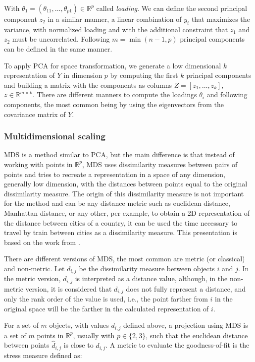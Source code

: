 With $\theta_{1} = (\theta_{11}, \dots, \theta_{p1}) \in \mathbb{R}^p$ called \textit{loading}.
%
We can define the second principal component $z_2$ in a similar manner, a linear combination of $y_i$ that maximizes the variance, with normalized loading and with the additional constraint that $z_1$ and $z_2$ must be uncorrelated. 
%
Following $m = \min{(n -1 , p)}$ principal components can be defined in the same manner.
%

%
To apply PCA for space transformation, we generate a low dimensional $k$ representation of $Y$ in dimension $p$ by computing the first $k$ principal components and building a matrix with the components as columns $Z = [z_1, \dots, z_k]$, $z \in \mathbb{R}^{m\times k}$.
%
There are different manners to compute the loadings $\theta_i$ and following components, the most common being by using the eigenvectors from the covariance matrix of $Y$. 

\subsubsection{Multidimensional scaling}
%
MDS is a method similar to PCA, but the main difference is that instead of working with points in $\mathbb{R}^p$, 
%
MDS uses dissimilarity measures between pairs of points and tries to recreate a representation in a space of any dimension, generally low dimension, with the distances between points equal to the original dissimilarity measure.
%
The origin of this dissimilarity measure is not important for the method and can be any distance metric such as euclidean distance, Manhattan distance, or any other, per example, to obtain a 2D representation of the distance between cities of a country, it can be used the time necessary to travel by train between cities as a dissimilarity measure.
%
This presentation is based on the work from \cite{cox2008multidimensional}.
%

There are different versions of MDS, the most common are metric (or classical) and non-metric. 
%
Let $d_{i, j}$ be the dissimilarity measure between objects $i$ and $j$.
%
In the metric version, $d_{i, j}$ is interpreted as a distance value, although,
%
in the non-metric version, it is considered that $d_{i, j}$ does not fully represent a distance, and only the rank order of the value is used, i.e., the point farther from $i$ in the original space will be the farther in the calculated representation of $i$.
%

For a set of $m$ objects, with values $d_{i, j}$ defined above, a projection using MDS is a set of $m$ points in $\mathbb{R}^{p}$, usually with $p \in \{2, 3\}$, such that the euclidean distance between points $\hat d_{i, j}$ is close to $d_{i, j}$.
%
A metric to evaluate the goodness-of-fit is the stress measure defined as:

